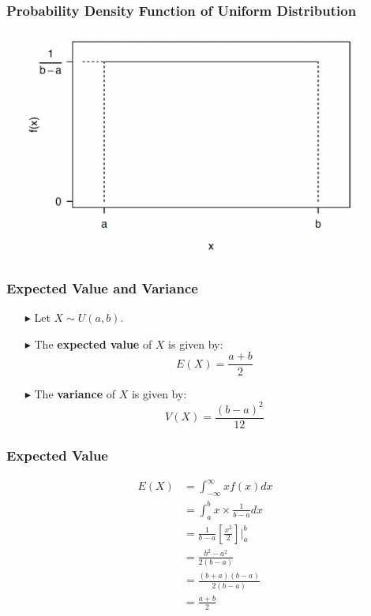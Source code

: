 \documentclass[12pt]{beamer}
\begin{document}
\begin{frame}
	\frametitle{Probability Density Function of Uniform Distribution}
	\centering
	\includegraphics[width=12cm]{pdf9.png}
\end{frame}
\begin{frame}
	\frametitle{Expected Value and Variance}
	
	\begin{itemize}
		\item[\color{blue}$\blacktriangleright$] Let $X \sim U(a,b)$.
		\item[\color{blue}$\blacktriangleright$] The \textbf{expected value} of $X$ is given by:
		\[E(X) = \frac{a + b}{2}\]
		\item[\color{blue}$\blacktriangleright$] The \textbf{variance} of $X$ is given by:
		\[V(X) = \frac{(b - a)^2}{12}\]
	\end{itemize}
	
\end{frame}
\begin{frame}
	\frametitle{Expected Value}
	
	\begin{align*}
		E(X) &= \int_{-\infty}^{\infty} x f(x) dx \\
		&= \int_a^b x \times \frac{1}{b-a} dx \\
		&= \frac{1}{b-a} \left[\frac{x^2}{2}\right]|_a^b \\
		&= \frac{b^2 - a^2}{2(b-a)} \\
		&= \frac{(b+a)(b-a)}{2(b-a)} \\
		&= \frac{a+b}{2}
	\end{align*}
	
\end{frame}
\end{document}
